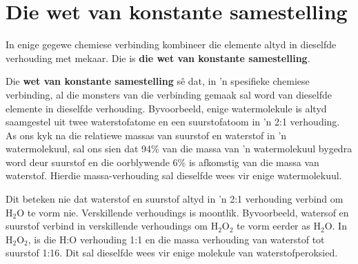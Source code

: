     \label{m38711*cid6}
            \section{Die wet van konstante samestelling}
            \nopagebreak
      \label{m38711*id65065}In enige gegewe chemiese verbinding kombineer die elemente altyd in dieselfde verhouding met mekaar. Die is \textbf{die wet van konstante samestelling}.\par 
\label{m38711*id65075}Die \textbf{wet van konstante samestelling} s\^{e} dat, in 'n spesifieke chemiese verbinding, al die monsters
van die verbinding gemaak sal word van dieselfde elemente in dieselfde verhouding. Byvoorbeeld, enige watermolekule is
altyd saamgestel uit twee waterstofatome en een suurstofatoom in 'n 2:1 verhouding. As ons kyk na die relatiewe massas van suurstof en waterstof in 'n watermolekuul, sal ons sien dat 94\% van die massa van 'n watermolekuul bygedra word deur suurstof en die oorblywende 6\% is afkomstig van die massa van waterstof. Hierdie massa-verhouding sal dieselfde wees vir enige watermolekuul.\par 
      \label{m38711*id65089}Dit beteken nie dat waterstof en suurstof altyd in 'n 2:1 verhouding verbind om $\text{H}{}_{2}\text{O}$ te vorm nie. Verskillende verhoudings is moontlik. Byvoorbeeld, watersof en suurstof verbind in verskillende verhoudings om $\text{H}{}_{2}\text{O}{}_{2}$ te vorm eerder as $\text{H}{}_{2}\text{O}$. In $\text{H}{}_{2}\text{O}{}_{2}$, is die H:O verhouding 1:1 en die massa verhouding van waterstof tot suurstof 1:16. Dit sal dieselfde wees vir enige molekule van waterstofperoksied.\par 
